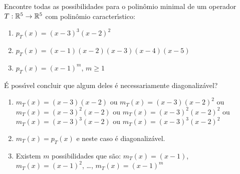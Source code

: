 \documentclass[12pt]{exam}
\begin{document}
\begin{exercicio}
  Encontre todas as possibilidades para o polin\^omio minimal de um operador $T : \mathbb{R}^5 \to \mathbb{R}^5$ com polin\^omio caracter{\'\i}stico:
  \begin{enumerate}[label=({\alph*})]
    \item $p_T(x) = (x - 3)^3(x - 2)^2$
    \item $p_T(x) = (x - 1)(x - 2)(x - 3)(x - 4)(x - 5)$
    \item $p_T(x) = (x - 1)^m$, $m \ge 1$
  \end{enumerate}
  \'E poss{\'\i}vel concluir que algum deles \'e necessariamente diagonaliz\'avel?
  \begin{solucao}
    \begin{enumerate}[label=({\alph*})]
      \item $m_T(x) = (x - 3)(x - 2)$ ou $m_T(x) = (x - 3)(x - 2)^2$ ou $m_T(x) = (x - 3)^2(x - 2)$ ou $m_T(x) = (x - 3)^2(x - 2)^2$ ou $m_T(x) = (x - 3)^3(x - 2)$ ou $m_T(x) = (x - 3)^3(x - 2)^2$
      \item $m_T(x) = p_T(x)$ e neste caso \'e diagonaliz\'avel.
      \item Existem $m$ possibilidades que s\~ao: $m_T(x) = (x - 1)$, $m_T(x) = (x - 1)^2$, \dots, $m_T(x) = (x - 1)^m$
      \end{enumerate}
  \end{solucao}
\end{exercicio}
\end{document}
